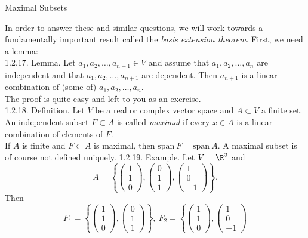 \documentclass[smaller,hyperref={CJKbookmarks=true}]{beamer}
\newcommand{\myseries}[2]{$#1_1,#1_2,\dots,#1_#2$}
\begin{document}
\begin{frame}{Maximal Subsets} \begin{spacing}{1}
In order to answer these and similar questions, we will work towards a fundamentally important result called the \emph{basis extension theorem}. First, we need a lemma:\\[10pt]
\alert{1.2.17. Lemma.} Let \myseries{a}{{n+1}}$\in V$ and assume that \myseries{a}{n} are independent and that \myseries{a}{{n+1}} are dependent. Then $a_{n+1}$ is a linear combination of (some of) \myseries{a}{n}.\\[11pt]
The proof is quite easy and left to you as an exercise.\\[11pt]
\alert{1.2.18. Definition.} Let $V$ be a real or complex vector space and $A\subset V$ a finite set. An independent subset $F\subset A$ is called \emph{maximal} if every $x\in A$ is a linear combination of elements of $F$.\\[11pt]
If $A$ is finite and $F\subset A$ is maximal, then $\text{span}~F=\text{span}~A$. A maximal subset is of course not defined uniquely.
\newpage
\alert{1.2.19. Example.} Let $V=\R^3$ and
\[A=\left\{\begin{pmatrix}
 1 \\ 1 \\ 0 \end{pmatrix},\begin{pmatrix}
 0 \\ 1 \\ 1 \end{pmatrix},\begin{pmatrix}
 1 \\ 0 \\ -1
  \end{pmatrix}\right\}.\]
Then
\[F_1=\left\{\begin{pmatrix}
 1 \\ 1 \\ 0 \end{pmatrix},\begin{pmatrix}
 0 \\ 1 \\ 1 \end{pmatrix}\right\},~F_2=\left\{\begin{pmatrix}
 1 \\ 1 \\ 0 \end{pmatrix},\begin{pmatrix}
 1 \\ 0 \\ -1

\end{pmatrix}\]
\end{spacing}
\end{frame}
\end{document}
